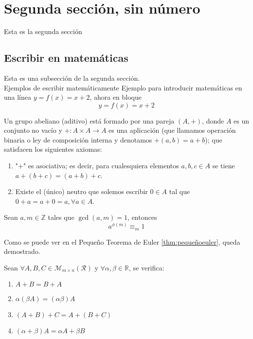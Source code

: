 \section*{Segunda sección, sin número}

Esta es la segunda sección
\subsection[Matemáticas]{Escribir en matemáticas}
Esta es una subsección de la segunda sección.\\
Ejemplos de escribir matemáticamente
Ejemplo para introducir matemáticas en una línea $y=f(x)=x+2$, ahora en bloque \[y=f(x)=x+2\]

\begin{definicion} \label{definicion:abeliano}
	Un grupo abeliano (aditivo) está formado por una pareja $(A, +)$, donde $A$ es un conjunto no vacío y $+ : A\times A \rightarrow A$ es una aplicación (que llamamos operación binaria o ley de composición interna y denotamos $+ (a, b) = a + b$); que satisfacen los siguientes axiomas:
	\begin{enumerate}
		\item "+" es asociativa; es decir, para cualesquiera elementos $ a,b,c\in A$ se tiene $a+(b+c)=(a+b)+c$.
		\item Existe el (único) neutro que solemos escribir $0\in A$ tal que $0+a=a+0=a, \forall a\in A$.
	\end{enumerate}
\end{definicion}

\begin{teorema} \label{thm:pequeñoeuler}
	Sean $a,m\in \mathbb{Z}$ tales que $\boxed{\gcd(a, m)=1}$, entonces \[a^{\phi(m)}\equiv_m1\]
\end{teorema}

Como se puede ver en el Pequeño Teorema de Euler \ref{thm:pequeñoeuler}, queda demostrado.

\begin{teorema}
	Sean $\forall A, B, C\in \mathcal{M}_{m\times n}(\mathcal{R})$ y $\forall \alpha, \beta\in \mathbb{R}$, se verifica:
	\begin{multicols}{2}
		\begin{enumerate} 
			\item $A+B=B+A$
			\item $\alpha(\beta A)=(\alpha \beta)A$
			\item $(A+B)+C=A+(B+C)$
			\item $(\alpha+\beta)A=\alpha A + \beta B$
		\end{enumerate}
	\end{multicols}
\end{teorema}


